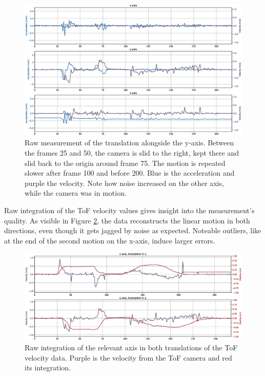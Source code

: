 \begin{figure}[H]
  \centering
  \includegraphics[width=1.0\textwidth]{images/tof_translation_measurement_y.eps}
  \caption{Raw measurement of the translation alongside the y-axis. Between the frames 25 and 50, the camera is slid to the right, kept there and slid back to the origin around frame 75. The motion is repeated slower after frame 100 and before 200. Blue is the acceleration and purple the velocity. Note how noise increased on the other axis, while the camera was in motion.}
  \label{im:tof_translation_measurement_y}
\end{figure}
Raw integration of the ToF velocity values gives insight into the measurement's quality. As visible in Figure \ref{im:tof_translation_measurement_integrated}, the data reconstructs the linear motion in both directions, even though it gets jagged by noise as expected. Noteable outliers, like at the end of the second motion on the x-axis, induce larger errors. 
\begin{figure}[H]
  \centering
  \includegraphics[width=1.0\textwidth]{images/tof_translation_measurement_integrated.eps}
  \caption{Raw integration of the relevant axis in both translations of the ToF velocity data. Purple is the velocity from the ToF camera and red its integration.}
  \label{im:tof_translation_measurement_integrated}
\end{figure} 

